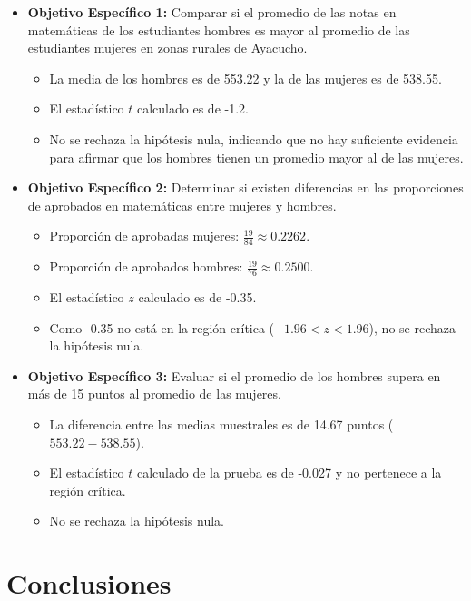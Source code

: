 \documentclass[
]{article}
\begin{document}
\begin{itemize}
  \item \textbf{Objetivo Específico 1:} Comparar si el promedio de las notas en matemáticas de los estudiantes hombres es mayor al promedio de las estudiantes mujeres en zonas rurales de Ayacucho.
    \begin{itemize}
        \item La media de los hombres es de 553.22 y la de las mujeres es de 538.55.
        \item El estadístico \( t \) calculado es de -1.2.
        \item No se rechaza la hipótesis nula, indicando que no hay suficiente evidencia para afirmar que los hombres tienen un promedio mayor al de las mujeres.
    \end{itemize}
    
  \item \textbf{Objetivo Específico 2:} Determinar si existen diferencias en las proporciones de aprobados en matemáticas entre mujeres y hombres.
    \begin{itemize}
        \item Proporción de aprobadas mujeres: \( \frac{19}{84} \approx 0.2262 \).
        \item Proporción de aprobados hombres: \( \frac{19}{76} \approx 0.2500 \).
        \item El estadístico \( z \) calculado es de -0.35.
        \item Como -0.35 no está en la región crítica (\(-1.96 < z < 1.96\)), no se rechaza la hipótesis nula.
    \end{itemize}
    
  \item \textbf{Objetivo Específico 3:} Evaluar si el promedio de los hombres supera en más de 15 puntos al promedio de las mujeres.
    \begin{itemize}
        \item La diferencia entre las medias muestrales es de 14.67 puntos (\(553.22 - 538.55\)).
        \item El estadístico \( t \) calculado de la prueba es de -0.027 y no pertenece a la región crítica.
        \item No se rechaza la hipótesis nula.
    \end{itemize}
\end{itemize}

\section*{Conclusiones}\label{conclusiones}
\end{document}
